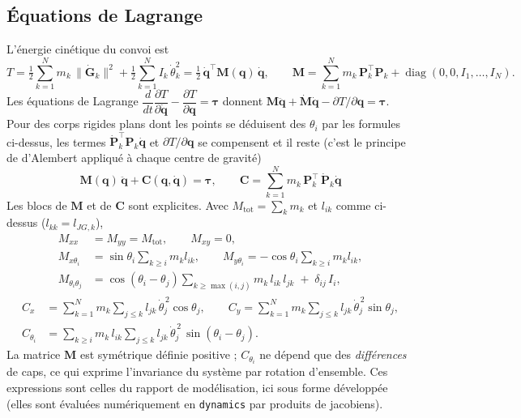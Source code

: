 \documentclass[11pt,a4paper]{article}
\newcommand{\vect}[1]{\bm{#1}}
\newcommand{\mat}[1]{\bm{#1}}
\newcommand{\T}{^{\!\top}}
\newcommand{\dt}[1]{\dot{#1}}
\newcommand{\ddt}[1]{\ddot{#1}}
\newcommand{\q}{\vect{q}}
\newcommand{\Mm}{\mat{M}}
\newcommand{\code}[1]{\texttt{#1}}
\begin{document}
\subsection{Équations de Lagrange}\label{sec:lagrange}
L'énergie cinétique du convoi est
\begin{equation}
 T=\tfrac12\sum_{k=1}^N m_k\,\|\dt{\vect G}_k\|^2+\tfrac12\sum_{k=1}^N I_k\,\dt\theta_k^2=\tfrac12\,\dt\q\T\Mm(\q)\,\dt\q,\qquad
 \Mm=\sum_{k=1}^N m_k\,\mat P_k\T\mat P_k+\operatorname{diag}(0,0,I_1,\dots,I_N).
\end{equation}
Les équations de Lagrange $\dfrac{d}{dt}\dfrac{\partial T}{\partial\dt\q}-\dfrac{\partial T}{\partial\q}=\vect\tau$ donnent $\Mm\ddt\q+\dt{\Mm}\dt\q-\partial T/\partial\q=\vect\tau$. Pour des corps rigides plans dont les points se déduisent des $\theta_i$ par les formules ci-dessus, les termes $\dt{\mat P}_k\T\mat P_k\dt\q$ et $\partial T/\partial\q$ se compensent et il reste (c'est le principe de d'Alembert appliqué à chaque centre de gravité)
\begin{equation}
 \boxed{\;\Mm(\q)\,\ddt\q+\vect C(\q,\dt\q)=\vect\tau,\qquad
 \vect C=\sum_{k=1}^N m_k\,\mat P_k\T\,\dt{\mat P}_k\dt\q\;}
\end{equation}
Les blocs de $\Mm$ et de $\vect C$ sont explicites. Avec $M_{\text{tot}}=\sum_km_k$ et $l_{ik}$ comme ci-dessus ($l_{kk}=l_{JG,k}$),
\begin{align}
 M_{xx}&=M_{yy}=M_{\text{tot}},\qquad M_{xy}=0,\\
 M_{x\theta_i}&=\sin\theta_i\sum_{k\ge i}m_kl_{ik},\qquad M_{y\theta_i}=-\cos\theta_i\sum_{k\ge i}m_kl_{ik},\\
 M_{\theta_i\theta_j}&=\cos(\theta_i-\theta_j)\sum_{k\ge\max(i,j)}m_k\,l_{ik}\,l_{jk}\;+\;\delta_{ij}\,I_i,
\end{align}
\begin{align}
 C_x&=\sum_{k=1}^Nm_k\sum_{j\le k}l_{jk}\,\dt\theta_j^{\,2}\cos\theta_j,\qquad
 C_y=\sum_{k=1}^Nm_k\sum_{j\le k}l_{jk}\,\dt\theta_j^{\,2}\sin\theta_j,\\
 C_{\theta_i}&=\sum_{k\ge i}m_k\,l_{ik}\sum_{j\le k}l_{jk}\,\dt\theta_j^{\,2}\,\sin(\theta_i-\theta_j).
\end{align}
La matrice $\Mm$ est symétrique définie positive ; $C_{\theta_i}$ ne dépend que des \emph{différences} de caps, ce qui exprime l'invariance du système par rotation d'ensemble. Ces expressions sont celles du rapport de modélisation, ici sous forme développée (elles sont évaluées numériquement en \code{dynamics} par produits de jacobiens).
\end{document}
